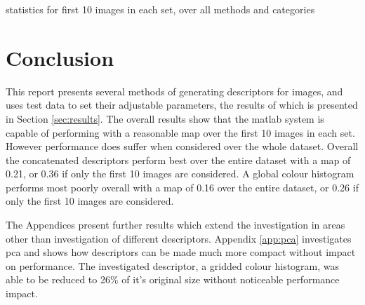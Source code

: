 \begin{table}[ht]
	\caption{ statistics for first 10 images in each set, over all methods and categories}
	\label{tbl:map-stats-at-10}
	\centering
\end{table}

\chapter{Conclusion} \label{sec:conclusion}
This report presents several methods of generating descriptors for images, and uses test data to  set their adjustable parameters, the results of which is presented in Section \ref{sec:results}. The overall results show that the \gls{matlab} system is capable of performing with a reasonable \gls{map} over the first 10 images in each set. However performance does suffer when considered over the whole dataset. Overall the concatenated descriptors perform best over the entire dataset with a \gls{map} of 0.21, or 0.36 if only the first 10 images are considered. A global colour histogram performs most poorly overall with a \gls{map} of 0.16 over the entire dataset, or 0.26 if only the first 10 images are considered.

The Appendices present further results which extend the investigation in areas other than investigation of different descriptors. Appendix \ref{app:pca} investigates \gls{pca} and shows how descriptors can be made much more compact without impact on performance. The investigated descriptor, a gridded colour histogram, was able to be reduced to 26\% of it's original size without noticeable performance impact.

